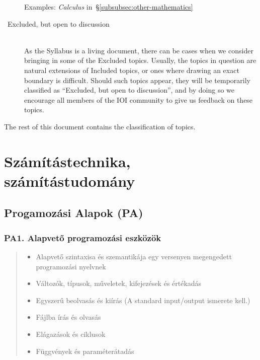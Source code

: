 \documentclass[a4paper,11pt,oneside]{article}
\newcommand{\cmark}{\ding{51}}%
\newcommand{\xmark}{\ding{55}}%
\newcommand{\CC}[1]{#1}
\newcommand{\Cincluded}{{\small\cmark}}
\newcommand{\Cexmaybe}{{\small\xmark\faQuestionCircle}}
\newcommand{\Iincluded}{\item[\hbox to 1.8em{\Cincluded\hfill}]}
\newcommand{\Iexmaybe}{\item[\hbox to 1.8em{\Cexmaybe\hfill}]}
\newenvironment{myitemize}{\begin{quote}\begin{itemize}\itemsep 0pt}{\end{itemize}\end{quote}}
\begin{document}
\begin{description}
    Examples: \emph{Calculus\/} in~\S\ref{subsubsec:other-mathematics}

\item[\Cexmaybe\ Excluded, but open to discussion]~\\
    As the Syllabus is a living document, there can be cases when we consider
    bringing in some of the Excluded topics. Usually, the topics in question
    are natural extensions of Included topics, or ones where drawing an exact
    boundary is difficult. Should such topics appear, they will be temporarily
    classified as ``Excluded, but open to discussion'', and by doing so we encourage 
    all members of the IOI community to give us feedback on these topics.
\end{description}

\bigskip

\noindent
The rest of this document contains the classification of topics.


\section {Számítástechnika, számítástudomány} %
\label{subsec:computing-science}

\subsection {Progamozási Alapok (PA)} %
\label{subsubsec:PF}

    \subsubsection*{PA1. Alapvető programozási eszközök} %

    \begin{myitemize}
    \Iincluded\CC{Alapvető szintaxisa és szemantikája egy versenyen megengedett programozási nyelvnek} %
    \Iincluded\CC{Változók, típusok, műveletek, kifejezések és értékadás} %
    \Iincluded\CC{Egyszerű beolvasás és kiírás} (A standard input/output ismerete kell.) %
    \Iexmaybe \CC{Fájlba írás és olvasás}
    \Iincluded\CC{Elágazások és ciklusok}  %
    \Iincluded\CC{Függvények és paraméterátadás} %
    \end{myitemize}
\end{document}

